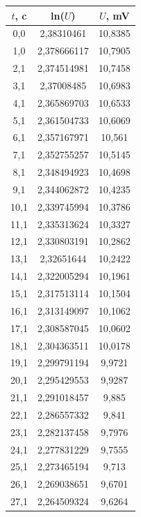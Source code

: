 \documentclass[a4paper,12pt]{article}
\begin{document}
    \begin{longtable}{|c|c|c|}
        \hline
        $t$, c & ln($U$) & $U$, mV \\
        \hline
        \endhead
        0,0 & 2,38310461 & 10,8385 \\ \hline
        1,0 & 2,378666117 & 10,7905 \\ \hline
        2,1 & 2,374514981 & 10,7458 \\ \hline
        3,1 & 2,37008485 & 10,6983 \\ \hline
        4,1 & 2,365869703 & 10,6533 \\ \hline
        5,1 & 2,361504733 & 10,6069 \\ \hline
        6,1 & 2,357167971 & 10,561 \\ \hline
        7,1 & 2,352755257 & 10,5145 \\ \hline
        8,1 & 2,348494923 & 10,4698 \\ \hline
        9,1 & 2,344062872 & 10,4235 \\ \hline
        10,1 & 2,339745994 & 10,3786 \\ \hline
        11,1 & 2,335313624 & 10,3327 \\ \hline
        12,1 & 2,330803191 & 10,2862 \\ \hline
        13,1 & 2,32651644 & 10,2422 \\ \hline
        14,1 & 2,322005294 & 10,1961 \\ \hline
        15,1 & 2,317513114 & 10,1504 \\ \hline
        16,1 & 2,313149097 & 10,1062 \\ \hline
        17,1 & 2,308587045 & 10,0602 \\ \hline
        18,1 & 2,304363511 & 10,0178 \\ \hline
        19,1 & 2,299791194 & 9,9721 \\ \hline
        20,1 & 2,295429553 & 9,9287 \\ \hline
        21,1 & 2,291018457 & 9,885 \\ \hline
        22,1 & 2,286557332 & 9,841 \\ \hline
        23,1 & 2,282137458 & 9,7976 \\ \hline
        24,1 & 2,277831229 & 9,7555 \\ \hline
        25,1 & 2,273465194 & 9,713 \\ \hline
        26,1 & 2,269038651 & 9,6701 \\ \hline
        27,1 & 2,264509324 & 9,6264 \\ \hline

\end{longtable}
\end{document}
